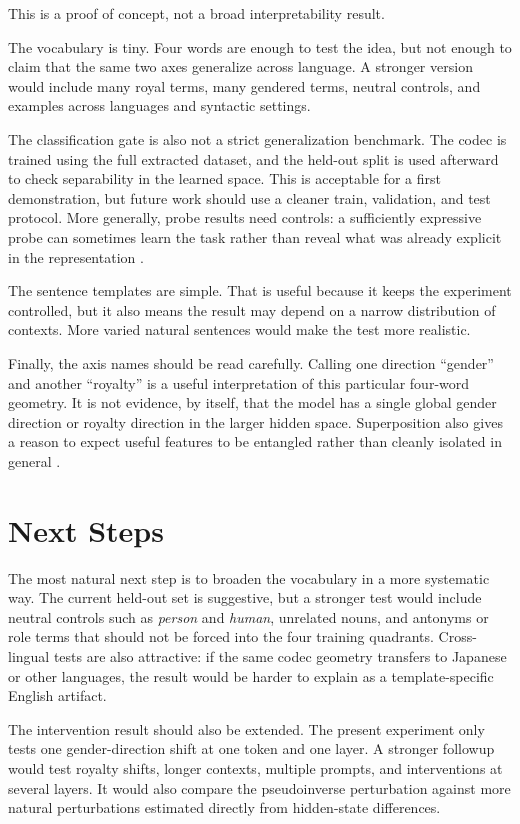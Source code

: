 \documentclass[11pt]{article}
\begin{document}
This is a proof of concept, not a broad interpretability result.

The vocabulary is tiny. Four words are enough to test the idea, but not enough
to claim that the same two axes generalize across language. A stronger version
would include many royal terms, many gendered terms, neutral controls, and
examples across languages and syntactic settings.

The classification gate is also not a strict generalization benchmark. The
codec is trained using the full extracted dataset, and the held-out split is
used afterward to check separability in the learned space. This is acceptable
for a first demonstration, but future work should use a cleaner train,
validation, and test protocol. More generally, probe results need controls:
a sufficiently expressive probe can sometimes learn the task rather than reveal
what was already explicit in the representation \cite{hewitt2019}.

The sentence templates are simple. That is useful because it keeps the
experiment controlled, but it also means the result may depend on a narrow
distribution of contexts. More varied natural sentences would make the test
more realistic.

Finally, the axis names should be read carefully. Calling one direction
``gender'' and another ``royalty'' is a useful interpretation of this particular
four-word geometry. It is not evidence, by itself, that the model has a single
global gender direction or royalty direction in the larger hidden space.
Superposition also gives a reason to expect useful features to be entangled
rather than cleanly isolated in general \cite{elhage2022}.

\section{Next Steps}

The most natural next step is to broaden the vocabulary in a more systematic
way. The current held-out set is suggestive, but a stronger test would include
neutral controls such as \emph{person} and \emph{human}, unrelated nouns, and
antonyms or role terms that should not be forced into the four training
quadrants. Cross-lingual tests are also attractive: if the same codec geometry
transfers to Japanese or other languages, the result would be harder to explain
as a template-specific English artifact.

The intervention result should also be extended. The present experiment only
tests one gender-direction shift at one token and one layer. A stronger followup
would test royalty shifts, longer contexts, multiple prompts, and interventions
at several layers. It would also compare the pseudoinverse perturbation against
more natural perturbations estimated directly from hidden-state differences.
\end{document}
